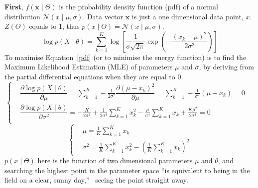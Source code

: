 \documentclass[11pt,twoside,a4paper]{article}
\begin{document}
	\textbf{First}, $f(\mathbf{x} \mid \Theta )$ is the probability density function (pdf) of a normal distribution $\mathcal{N}(x \mid \mu, \sigma )$.
	Data vector $ \mathbf{x} $ is just a one dimensional data point, $x$.
	$ Z( \Theta) $ equals to 1, thus $p(x \mid \Theta ) = \mathcal{N}(x \mid \mu, \sigma )$.
	\begin{equation}
	\log p(X \mid \theta ) =  \sum_{k=1}^K \log [\frac{1}{\sigma \sqrt{2\pi}} \exp(-\frac{(x_k-\mu)^{2}}{2\sigma^{2}})]
	\label{pdf}
	\end{equation}
	To maximise Equation~\ref{pdf} (or to minimise the energy function) is to find the Maximum Likelihood Estimation (MLE) of parameters $ \mu $ and $ \sigma $, by deriving from the partial differential equations when they are equal to 0. 
	\begin{equation}
	\left\{
	\begin{aligned}
	   &\dfrac{\partial  \log p(X \mid \theta ) }{\partial \mu}= \sum_{k=1}^K -\frac{1}{2\sigma^{2}}\dfrac{\partial (\mu-x_k)^{2}}{\partial \mu} = \sum_{k=1}^K -\frac{1}{\sigma^{2}}(\mu-x_k) = 0 \quad\\
	   &\dfrac{\partial  \log p(X \mid \theta ) }{\partial \sigma^{2}}= -\frac{K}{2\sigma^{2}}+\frac{1}{2\sigma^{4}}\sum_{k=1}^K x_k^{2} -\frac{\mu}{\sigma^{4}}\sum_{k=1}^K x_k + \frac{K\mu^{2}}{2\sigma^{4}} = 0 \quad\\
	\end{aligned}
	\right.
	\end{equation}
	\begin{equation}
	\left\{
	\begin{aligned}
	    &\mu= \frac{1}{K}\sum_{k=1}^K x_k  \quad\\
	    &\sigma^{2} = \frac{1}{K}\sum_{k=1}^K x_k^{2} - (\frac{1}{K}\sum_{k=1}^K x_k)^{2}
	\end{aligned}
	\right.
	\end{equation}
	$p(x\mid \Theta )$ here is the function of two dimensional parameters $\mu$ and $\theta$, and searching the highest point in the parameter space ``is equivalent to being in the field on a clear, sunny day,''~\cite{woodfordnotes} seeing the point straight away.
	
\end{document}
